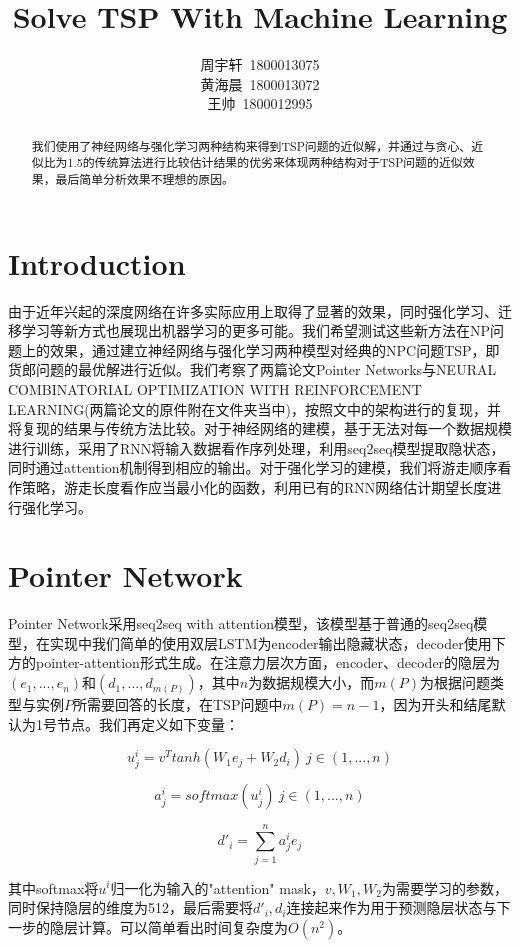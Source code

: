 \documentclass[a4paper]{article}
\title{Solve TSP With Machine Learning}
\author{周宇轩\ 1800013075\\黄海晨\ 1800013072\\王帅\ 1800012995}
\date{}
\begin{document}
\maketitle

\begin{abstract}
        我们使用了神经网络与强化学习两种结构来得到TSP问题的近似解，并通过与贪心、近似比为1.5的传统算法进行比较估计结果的优劣来体现两种结构对于TSP问题的近似效果，最后简单分析效果不理想的原因。
\end{abstract}

\section*{Introduction}

由于近年兴起的深度网络在许多实际应用上取得了显著的效果，同时强化学习、迁移学习等新方式也展现出机器学习的更多可能。我们希望测试这些新方法在NP问题上的效果，通过建立神经网络与强化学习两种模型对经典的NPC问题TSP，即货郎问题的最优解进行近似。我们考察了两篇论文Pointer Networks与NEURAL COMBINATORIAL OPTIMIZATION WITH REINFORCEMENT LEARNING(两篇论文的原件附在文件夹当中)，按照文中的架构进行的复现，并将复现的结果与传统方法比较。对于神经网络的建模，基于无法对每一个数据规模进行训练，采用了RNN将输入数据看作序列处理，利用seq2seq模型提取隐状态，同时通过attention机制得到相应的输出。对于强化学习的建模，我们将游走顺序看作策略，游走长度看作应当最小化的函数，利用已有的RNN网络估计期望长度进行强化学习。

\section*{Pointer Network}

Pointer Network采用seq2seq with attention模型，该模型基于普通的seq2seq模型，在实现中我们简单的使用双层LSTM为encoder输出隐藏状态，decoder使用下方的pointer-attention形式生成。在注意力层次方面，encoder、decoder的隐层为$(e_1,...,e_n)$和$(d_1,...,d_{m(P)})$，其中$n$为数据规模大小，而$m(P)$为根据问题类型与实例$P$所需要回答的长度，在TSP问题中$m(P) = n -1$，因为开头和结尾默认为1号节点。我们再定义如下变量：

$$u^i_j = v^T tanh(W_1e_j+W_2d_i)\ j\in (1,...,n)$$

$$a^i_j = softmax(u^i_j)\ j\in (1,...,n)$$

$$d'_i = \sum_{j=1}^n a^i_j e_j$$

其中softmax将$u^i$归一化为输入的"attention" mask，$v,W_1,W_2$为需要学习的参数，同时保持隐层的维度为512，最后需要将$d'_i,d_i$连接起来作为用于预测隐层状态与下一步的隐层计算。可以简单看出时间复杂度为$O(n^2)$。
\end{document}
